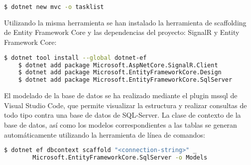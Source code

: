 \begin{lstlisting}[basicstyle=\small,xrightmargin=.10\textwidth,xleftmargin=.10\textwidth,language=bash]
    $ dotnet new mvc -o tasklist
\end{lstlisting}

Utilizando la misma herramienta se han instalado la herramienta de scaffolding de Entity Framework Core y las dependencias del proyecto: SignalR y Entity Framework Core:

\begin{lstlisting}[basicstyle=\small,xrightmargin=.10\textwidth,xleftmargin=.10\textwidth,language=bash]
    $ dotnet tool install --global dotnet-ef
    $ dotnet add package Microsoft.AspNetCore.SignalR.Client
    $ dotnet add package Microsoft.EntityFrameworkCore.Design
    $ dotnet add package Microsoft.EntityFrameworkCore.SqlServer
\end{lstlisting}

El modelado de la base de datos se ha realizado mediante el plugin mssql de Visual Studio Code, que permite visualizar la estructura y realizar consultas de todo tipo contra una base de datos de SQL-Server. La clase de contexto de la base de datos, así como los modelos correspondientes a las tablas se generan automáticamente utilizando la herramienta de línea de comandos:

\begin{lstlisting}[basicstyle=\small,xrightmargin=.10\textwidth,xleftmargin=.10\textwidth,language=bash]
    $ dotnet ef dbcontext scaffold "<connection-string>" _ 
        Microsoft.EntityFrameworkCore.SqlServer -o Models
\end{lstlisting}